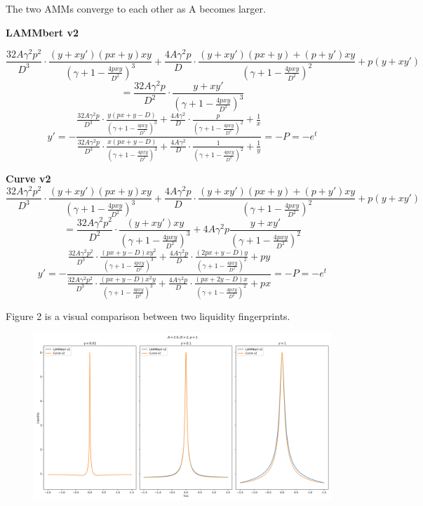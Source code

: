\documentclass{article}
\begin{document}
The two AMMs converge to each other as A becomes larger.

\textbf{LAMMbert v2}

$$\frac{32A\gamma^2p^2}{D^3}\cdot\frac{(y+xy')(px+y)xy}{\left(\gamma+1-\frac{4pxy}{D^2}\right)^3}+\frac{4A\gamma^2p}{D}\cdot\frac{(y+xy')(px+y)+(p+y')xy}{\left(\gamma+1-\frac{4pxy}{D^2}\right)^2}+p(y+xy')$$
$$=\frac{32A\gamma^2p}{D^2}\cdot\frac{y+xy'}{\left(\gamma+1-\frac{4pxy}{D^2}\right)^3}$$
$$y'=-\frac{\frac{32A\gamma^2p}{D^3}\cdot\frac{y(px+y-D)}{\left(\gamma+1-\frac{4pxy}{D^2}\right)^3}+\frac{4A\gamma^2}{D}\cdot\frac{p}{\left(\gamma+1-\frac{4pxy}{D^2}\right)^2}+\frac{1}{x}}{\frac{32A\gamma^2p}{D^3}\cdot\frac{x(px+y-D)}{\left(\gamma+1-\frac{4pxy}{D^2}\right)^3}+\frac{4A\gamma^2}{D}\cdot\frac{1}{\left(\gamma+1-\frac{4pxy}{D^2}\right)^2}+\frac{1}{y}}=-P=-e^t$$

\textbf{Curve v2}
$$\frac{32A\gamma^2p^2}{D^3}\cdot\frac{(y+xy')(px+y)xy}{\left(\gamma+1-\frac{4pxy}{D^2}\right)^3}+\frac{4A\gamma^2p}{D}\cdot\frac{(y+xy')(px+y)+(p+y')xy}{\left(\gamma+1-\frac{4pxy}{D^2}\right)^2}+p(y+xy')$$
$$=\frac{32A\gamma^2p^2}{D^2}\cdot\frac{(y+xy')xy}{\left(\gamma+1-\frac{4pxy}{D^2}\right)^3}+4A\gamma^2p\frac{y+xy'}{\left(\gamma+1-\frac{4pxy}{D^2}\right)^2}$$
$$y'=-\frac{\frac{32A\gamma^2p^2}{D^3}\cdot\frac{(px+y-D)xy^2}{\left(\gamma+1-\frac{4pxy}{D^2}\right)^3}+\frac{4A\gamma^2p}{D}\cdot\frac{(2px+y-D)y}{\left(\gamma+1-\frac{4pxy}{D^2}\right)^2}+py}{\frac{32A\gamma^2p^2}{D^3}\cdot\frac{(px+y-D)x^2y}{\left(\gamma+1-\frac{4pxy}{D^2}\right)^3}+\frac{4A\gamma^2p}{D}\cdot\frac{(px+2y-D)x}{\left(\gamma+1-\frac{4pxy}{D^2}\right)^2}+px}=-P=-e^t$$

Figure 2 is a visual comparison between two liquidity fingerprints.

\begin{figure}[H]
    \centering
    \includegraphics[width=1\linewidth]{figure2.png}
    \label{2}
\end{figure}
\end{document}
